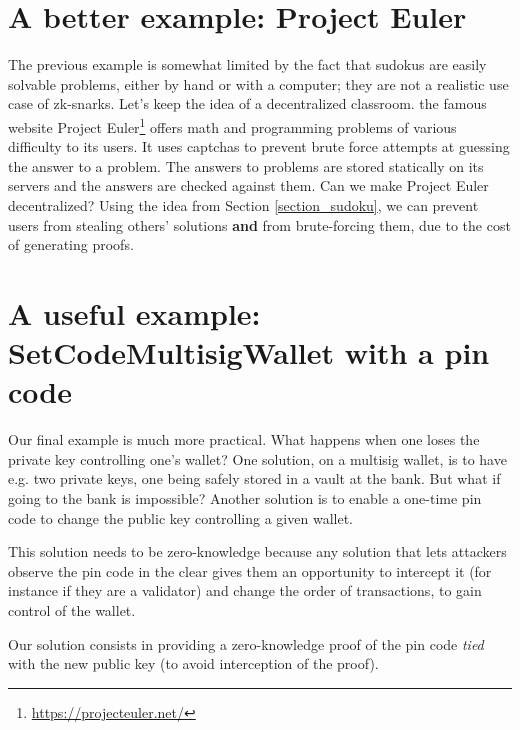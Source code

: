 \documentclass[10pt,a4paper]{article}
\begin{document}
\section{A better example: Project Euler}
\label{section_euler}

The previous example is somewhat limited by the fact that sudokus are easily solvable problems, either by hand or with a computer; they are not a realistic use case of zk-snarks. Let's keep the idea of a decentralized classroom. the famous website Project Euler\footnote{\url{https://projecteuler.net/}} offers math and programming problems of various difficulty to its users. It uses captchas to prevent brute force attempts at guessing the answer to a problem. The answers to problems are stored statically on its servers and the answers are checked against them. Can we make Project Euler decentralized? Using the idea from Section \ref{section_sudoku}, we can prevent users from stealing others' solutions \textbf{and} from brute-forcing them, due to the cost of generating proofs.


\section{A useful example: SetCodeMultisigWallet with a pin code}
\label{section_pincode}

Our final example is much more practical. What happens when one loses the private key controlling one's wallet? One solution, on a multisig wallet, is to have e.g. two private keys, one being safely stored in a vault at the bank. But what if going to the bank is impossible? Another solution is to enable a one-time pin code to change the public key controlling a given wallet.

This solution needs to be zero-knowledge because any solution that lets attackers observe the pin code in the clear gives them an opportunity to intercept it (for instance if they are a validator) and change the order of transactions, to gain control of the wallet.

Our solution consists in providing a zero-knowledge proof of the pin code \emph{tied} with the new public key (to avoid interception of the proof).
\end{document}
